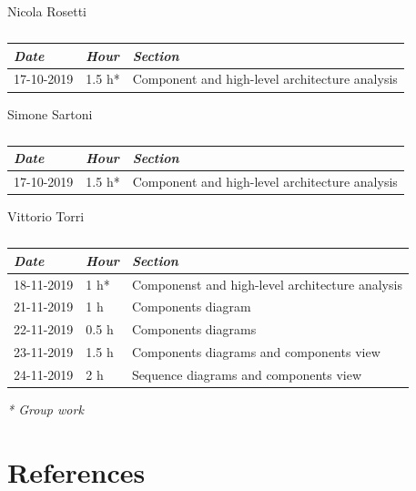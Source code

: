 \documentclass[a4paper]{report}
\begin{document}
\begin{table}[H]
\centering
Nicola Rosetti \\
\begin{tabular}{p{2cm}p{1.5cm}p{7cm}}
\toprule
\textit{Date} & \textit{Hour} & \textit{Section} \\ \midrule
17-10-2019 & 1.5 h* & Component and high-level architecture analysis \\ \midrule
\bottomrule
\end{tabular}
\caption[Nicola Rosetti's effort table]{}
\end{table}


\vspace*{1 cm}
\begin{table}[H]
\centering
Simone Sartoni \\
\begin{tabular}{p{2cm}p{1.5cm}p{7cm}}
\toprule
\textit{Date} & \textit{Hour} & \textit{Section} \\ \midrule
17-10-2019 & 1.5 h* & Component and high-level architecture analysis \\ \midrule
\bottomrule
\end{tabular}
\caption[Simone Sartoni's effort table]{}
\end{table}
\vspace*{1 cm}
\begin{table}[H]
\centering
Vittorio Torri \\
\begin{tabular}{p{2cm}p{1.5cm}p{7cm}}
\toprule
\textit{Date} & \textit{Hour} & \textit{Section} \\ \midrule
18-11-2019 & 1 h* & Componenst and high-level architecture analysis \\ \midrule
21-11-2019 & 1 h  & Components diagram \\ \midrule
22-11-2019 & 0.5 h & Components diagrams \\ \midrule
23-11-2019 & 1.5 h & Components diagrams and components view\\ \midrule
24-11-2019 & 2 h & Sequence diagrams and components view \\ \midrule
\bottomrule
\end{tabular}
\caption[Vittorio Torri's effort table]{}
\end{table}
\textit{* Group work}

\chapter{References}
\end{document}
